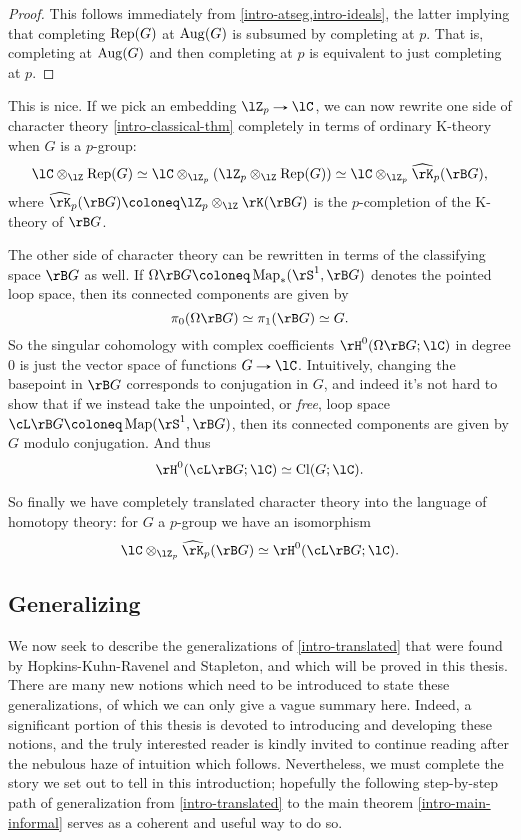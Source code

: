 \begin{proof}
  This follows immediately from \cref{intro-atseg,intro-ideals}, the
  latter implying that completing $\operatorname{Rep}(G)$ at $\operatorname{Aug}(G)$ is subsumed
  by completing at $p$. That is, completing at $\operatorname{Aug}(G)$ and then
  completing at $p$ is equivalent to just completing at $p$.
\end{proof}

This is nice. If we pick an embedding $\lZ_p \to \lC$, we can now
rewrite one side of character theory \cref{intro-classical-thm}
completely in terms of ordinary K-theory when $G$ is a $p$-group:
\[
\lC \otimes_\lZ \Rep(G) \iso
\lC \otimes_{\lZ_p} (\lZ_p \otimes_\lZ \Rep(G)) \iso
\lC \otimes_{\lZ_p} \hat\rK_p(\rB G),
\]
where $\hat\rK_p(\rB G) \ce \lZ_p \otimes_\lZ \rK(\rB G)$ is the
$p$-completion of the K-theory of $\rB G$.

The other side of character theory can be rewritten in terms of the
classifying space $\rB G$ as well. If
$\Omega\rB G \ce \Map_*(\rS^1,\rB G)$ denotes the pointed loop space,
then its connected components are given by
\[
\pi_0(\Omega\rB G) \iso \pi_1(\rB G) \iso G.
\]
So the singular cohomology with complex coefficients
$\rH^0(\Omega\rB G;\lC)$ in degree $0$ is just the vector space of
functions $G \to \lC$. Intuitively, changing the basepoint in $\rB G$
corresponds to conjugation in $G$, and indeed it's not hard to show
that if we instead take the unpointed, or \emph{free}, loop space
$\cL \rB G \ce \Map(\rS^1,\rB G)$, then its connected components are
given by $G$ modulo conjugation. And thus
\[
\rH^0(\cL\rB G;\lC) \iso \Cl(G;\lC).
\]

So finally we have completely translated character theory into the
language of homotopy theory: for $G$ a $p$-group we have an
isomorphism
\begin{equation}
  \label{intro-translated}
  \lC \otimes_{\lZ_p} \hat\rK_p(\rB G) \iso \rH^0(\cL\rB G; \lC).
\end{equation}


\subsection{Generalizing}
\label{intro-gen}

We now seek to describe the generalizations of \cref{intro-translated}
that were found by Hopkins-Kuhn-Ravenel and Stapleton, and which will
be proved in this thesis. There are many new notions which need to be
introduced to state these generalizations, of which we can only give a
vague summary here. Indeed, a significant portion of this thesis is
devoted to introducing and developing these notions, and the truly
interested reader is kindly invited to continue reading after the
nebulous haze of intuition which follows. Nevertheless, we must
complete the story we set out to tell in this introduction; hopefully
the following step-by-step path of generalization from
\cref{intro-translated} to the main theorem \cref{intro-main-informal}
serves as a coherent and useful way to do so.

